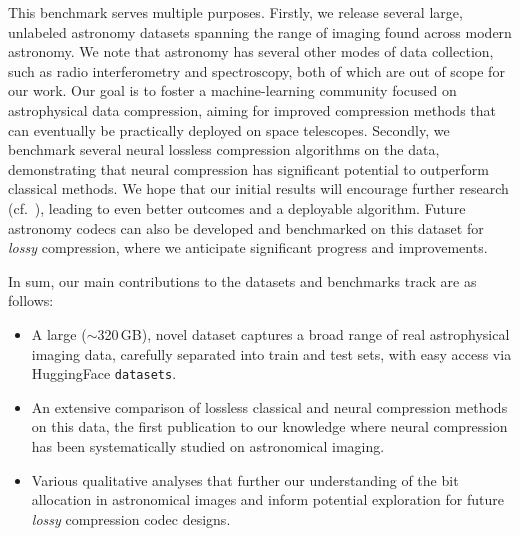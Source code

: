 
This benchmark serves multiple purposes. Firstly, we release several large, unlabeled astronomy datasets spanning the range of imaging found across modern astronomy. We note that astronomy has several other modes of data collection, such as radio interferometry and spectroscopy, both of which are out of scope for our work. Our goal is to foster a machine-learning community focused on astrophysical data compression, aiming for improved compression methods that can eventually be practically deployed on space telescopes. Secondly, we benchmark several neural lossless compression algorithms on the data, demonstrating that neural compression has significant potential to outperform classical methods. We hope that our initial results will encourage further research (cf.~\citealt{2022NatRP...4..413T}), leading to even better outcomes and a deployable algorithm. 
Future astronomy codecs can also be developed and benchmarked on this dataset for \emph{lossy} compression, where we anticipate significant progress and improvements. 

In sum, our main contributions to the datasets and benchmarks track are as follows:%
\begin{itemize}
\item A large ($\sim$320\,GB), novel dataset captures a broad range of real astrophysical imaging data, carefully separated into train and test sets, with easy access via HuggingFace \texttt{datasets}.
\item An extensive comparison of  lossless classical and neural compression methods on this data, the first publication to our knowledge where neural compression has been systematically studied on astronomical imaging.
\item Various qualitative analyses that further our understanding of the bit allocation in astronomical images and inform potential exploration for future \textit{lossy} compression codec designs.
\end{itemize}


